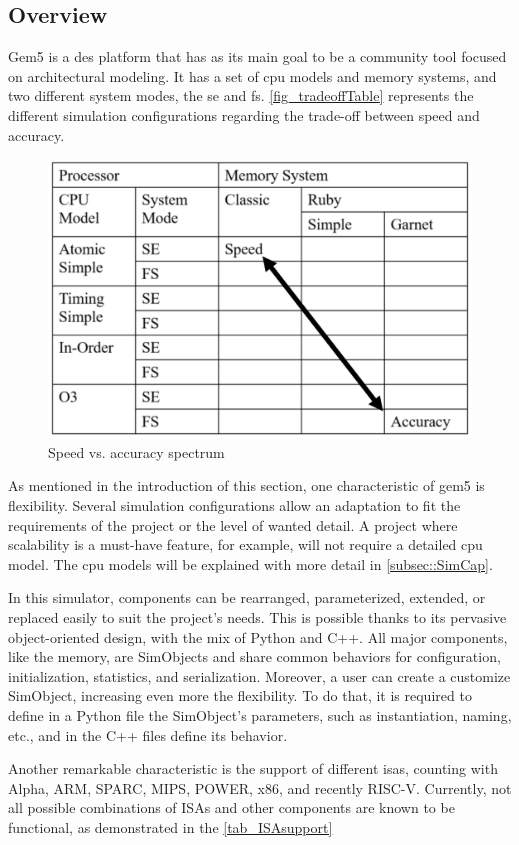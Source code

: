 \subsection{Overview}

Gem5 is a \gls{des} platform that has as its main goal to be a community tool focused on architectural modeling. It has a set of \gls{cpu} models and memory systems, and two different system modes, the \gls{se} and \gls{fs}. \autoref{fig_tradeoffTable} represents the different simulation configurations regarding the trade-off between speed and accuracy. 

\begin{figure}[H]
	\centering
 	\includegraphics[width=0.6\linewidth]{Images/tradeoffTable.png}
 	\caption{Speed vs. accuracy spectrum \cite{TheGem5Simulator}}
	 \label{fig_tradeoffTable}
\end{figure}

As mentioned in the introduction of this section, one characteristic of gem5 is flexibility. Several simulation configurations allow an adaptation to fit the requirements of the project or the level of wanted detail. A project where scalability is a must-have feature, for example, will not require a detailed \gls{cpu} model. The \gls{cpu} models will be explained with more detail in \autoref{subsec::SimCap}. 

In this simulator, components can be rearranged, parameterized, extended, or replaced easily to suit the project's needs. This is possible thanks to its pervasive object-oriented design, with the mix of Python and C++. All major components, like the memory, are SimObjects and share common behaviors for configuration, initialization, statistics, and serialization. Moreover, a user can create a customize SimObject, increasing even more the flexibility. To do that, it is required to define in a Python file the SimObject’s parameters, such as instantiation, naming, etc., and in the C++ files define its behavior.

Another remarkable characteristic is the support of different \glspl{isa}, counting with Alpha, ARM, SPARC, MIPS, POWER, x86, and recently RISC-V. Currently, not all possible combinations of ISAs and other components are known to be functional, as demonstrated in the \autoref{tab_ISAsupport}

